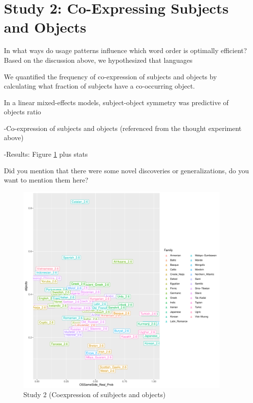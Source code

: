 \documentclass[11pt,a4paper]{article}
\begin{document}
\section{Study 2: Co-Expressing Subjects and Objects}

In what ways do usage patterns influence which word order is optimally efficient?
Based on the discussion above, we hypothesized that languages 

We quantified the frequency of co-expression of subjects and objects by calculating what fraction of subjects have a co-occurring object.

In a linear mixed-effects models, subject-object symmetry was predictive of objects ratio

-Co-expression of subjects and objects (referenced from the thought experiment above)

-Results: Figure \ref{fig:study2} plus stats

{\color{blue}Did you mention that there were some novel discoveries or generalizations, do you want to mention them here?}

\begin{figure}
    \centering
    \includegraphics[width=0.95\textwidth]{figures/objects-order-pureud.pdf}
    \caption{Study 2 (Coexpression of suibjects and objects)}
    \label{fig:study2}
\end{figure}
\end{document}
